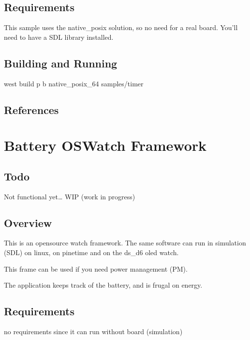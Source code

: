 \documentclass[letterpaper,10pt,english]{sphinxmanual}
\begin{document}
\subsection{Requirements}
\label{\detokenize{samples/appsamplestimerREADME:requirements}}
This sample uses the native\_posix solution, so no need for a real board.
You’ll need to have a SDL library installed.


\subsection{Building and Running}
\label{\detokenize{samples/appsamplestimerREADME:building-and-running}}
west build \sphinxhyphen{}p \sphinxhyphen{}b native\_posix\_64 samples/timer


\subsection{References}
\label{\detokenize{samples/appsamplestimerREADME:references}}

\section{Battery OSWatch Framework}
\label{\detokenize{samples/oswatch-batteryREADME:battery-oswatch-framework}}\label{\detokenize{samples/oswatch-batteryREADME:oswatch}}\label{\detokenize{samples/oswatch-batteryREADME::doc}}

\subsection{Todo}
\label{\detokenize{samples/oswatch-batteryREADME:todo}}
Not functional yet…
WIP (work in progress)


\subsection{Overview}
\label{\detokenize{samples/oswatch-batteryREADME:overview}}
This is an opensource watch framework.
The same software can run in simulation (SDL) on linux, on pinetime and on the ds\_d6 oled watch.

This frame can be used if you need power management (PM).

The application keeps track of the battery, and is frugal on energy.


\subsection{Requirements}
\label{\detokenize{samples/oswatch-batteryREADME:requirements}}
no requirements since it can run without board (simulation)
\end{document}
